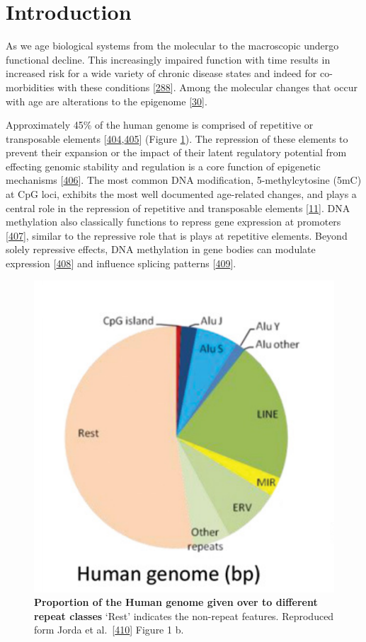 \documentclass[
]{book}
\begin{document}
\hypertarget{AluIntro}{%
\section{Introduction}\label{AluIntro}}

As we age biological systems from the molecular to the macroscopic undergo functional decline.
This increasingly impaired function with time results in increased risk for a wide variety of chronic disease states and indeed for co-morbidities with these conditions {[}\protect\hyperlink{ref-Partridge2018}{288}{]}.
Among the molecular changes that occur with age are alterations to the epigenome {[}\protect\hyperlink{ref-Booth2016}{30}{]}.

Approximately 45\% of the human genome is comprised of repetitive or transposable elements {[}\protect\hyperlink{ref-Deniz2019}{404},\protect\hyperlink{ref-Kazazian2017}{405}{]} (Figure \ref{fig:propRepeats}).
The repression of these elements to prevent their expansion or the impact of their latent regulatory potential from effecting genomic stability and regulation is a core function of epigenetic mechanisms {[}\protect\hyperlink{ref-Gregory2005}{406}{]}.
The most common DNA modification, 5-methylcytosine (5mC) at CpG loci, exhibits the most well documented age-related changes, and plays a central role in the repression of repetitive and transposable elements {[}\protect\hyperlink{ref-Lopez-Otin2013}{11}{]}.
DNA methylation also classically functions to repress gene expression at promoters {[}\protect\hyperlink{ref-Deaton2011}{407}{]}, similar to the repressive role that is plays at repetitive elements.
Beyond solely repressive effects, DNA methylation in gene bodies can modulate expression {[}\protect\hyperlink{ref-Hellman2007}{408}{]} and influence splicing patterns {[}\protect\hyperlink{ref-Shukla2011}{409}{]}.

\begin{figure}

{\centering \includegraphics[width=0.4\linewidth]{./figs/Jorda_Peinado_prop_repeats} 

}

\caption{\textbf{Proportion of the Human genome given over to different repeat classes} `Rest' indicates the non-repeat features. Reproduced form Jorda et al.~{[}\protect\hyperlink{ref-Jorda2017}{410}{]} Figure 1 b.}\label{fig:propRepeats}
\end{figure}
\end{document}
